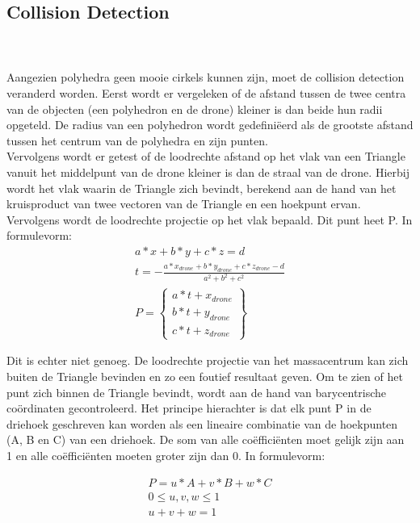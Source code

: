 \subsection{Collision Detection}
\\\\
Aangezien polyhedra geen mooie cirkels kunnen zijn, moet de collision detection veranderd worden. Eerst wordt er vergeleken of de afstand tussen de twee centra van de objecten (een polyhedron en de drone) kleiner is dan beide hun radii opgeteld. De radius van een polyhedron wordt gedefiniëerd als de grootste afstand tussen het centrum van de polyhedra en zijn punten. \\
\noindent
Vervolgens wordt er getest of de loodrechte afstand op het vlak van een Triangle vanuit het middelpunt van de drone kleiner is dan de straal van de drone. Hierbij wordt het vlak waarin de Triangle zich bevindt, berekend aan de hand van het kruisproduct van twee vectoren van de Triangle en een hoekpunt ervan. Vervolgens wordt de loodrechte projectie op het vlak bepaald. Dit punt heet P. In formulevorm: 
\begin{gather*}
	a*x + b*y + c*z = d \\ 
	t = -\frac{a * x_{drone} + b * y_{drone} + c * z_{drone} - d}{a^2 + b^2 + c^2}  \\ P =
	\begin{Bmatrix}
	a*t + x_{drone}\\ 
	b*t + y_{drone}\\ 
	c*t + z_{drone}
	\end{Bmatrix}
\end{gather*}

\noindent
 Dit is echter niet genoeg. De loodrechte projectie van het massacentrum  kan zich buiten de Triangle bevinden en zo een foutief resultaat geven. Om te zien of het punt zich binnen de Triangle bevindt, wordt aan de hand van barycentrische coördinaten gecontroleerd. Het principe hierachter is dat elk punt P in de driehoek geschreven kan worden als een lineaire combinatie van de hoekpunten (A, B en C) van een driehoek. De som van alle coëfficiënten moet gelijk zijn aan 1 en alle coëfficiënten moeten groter zijn dan 0. In formulevorm:
 
 \begin{gather*}
 	P = u*A + v*B + w*C \\
 	0 \le u,v,w \le 1 \\
 	u + v + w = 1
 \end{gather*}

